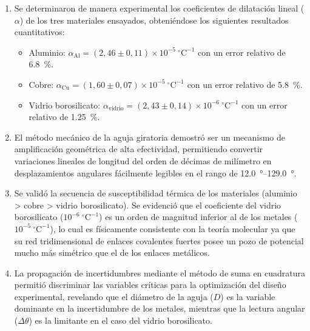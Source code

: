 \begin{enumerate}
    \item Se determinaron de manera experimental los coeficientes de dilatación lineal ($\alpha$) de los tres materiales ensayados, obteniéndose los siguientes resultados cuantitativos:
    \begin{itemize}
        \item Aluminio: $\alpha_{\text{Al}} = (2{,}46 \pm 0{,}11) \times 10^{-5}\ ^\circ\text{C}^{-1}$ con un error relativo de \qty{6,8}{\percent}.
        \item Cobre: $\alpha_{\text{Cu}} = (1{,}60 \pm 0{,}07) \times 10^{-5}\ ^\circ\text{C}^{-1}$ con un error relativo de \qty{5,8}{\percent}.
        \item Vidrio borosilicato: $\alpha_{\text{vidrio}} = (2{,}43 \pm 0{,}14) \times 10^{-6}\ ^\circ\text{C}^{-1}$ con un error relativo de \qty{1,25}{\percent}.
    \end{itemize}
    \item El método mecánico de la aguja giratoria demostró ser un mecanismo de amplificación geométrica de alta efectividad, permitiendo convertir variaciones lineales de longitud del orden de décimas de milímetro en desplazamientos angulares fácilmente legibles en el rango de \qtyrange{12,0}{129,0}{\degree}.
    \item Se validó la secuencia de susceptibilidad térmica de los materiales (aluminio > cobre > vidrio borosilicato). Se evidenció que el coeficiente del vidrio borosilicato ($10^{-6}\ ^\circ\text{C}^{-1}$) es un orden de magnitud inferior al de los metales ($10^{-5}\ ^\circ\text{C}^{-1}$), lo cual es físicamente consistente con la teoría molecular ya que su red tridimensional de enlaces covalentes fuertes posee un pozo de potencial mucho más simétrico que el de los enlaces metálicos.
    \item La propagación de incertidumbres mediante el método de suma en cuadratura permitió discriminar las variables críticas para la optimización del diseño experimental, revelando que el diámetro de la aguja ($D$) es la variable dominante en la incertidumbre de los metales, mientras que la lectura angular ($\Delta\theta$) es la limitante en el caso del vidrio borosilicato.
\end{enumerate}